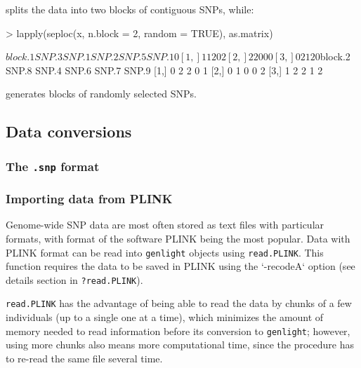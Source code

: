 \documentclass{article}
\begin{document}
splits the data into two blocks of contiguous SNPs, while:
\begin{Schunk}
\begin{Sinput}
> lapply(seploc(x, n.block = 2, random = TRUE), as.matrix)
\end{Sinput}
\begin{Soutput}
$block.1
     SNP.3 SNP.1 SNP.2 SNP.5 SNP.10
[1,]     1     1     2     0      2
[2,]     2     2     0     0      0
[3,]     0     2     1     2      0

$block.2
     SNP.8 SNP.4 SNP.6 SNP.7 SNP.9
[1,]     0     2     2     0     1
[2,]     0     1     0     0     2
[3,]     1     2     2     1     2
\end{Soutput}
\end{Schunk}
generates blocks of randomly selected SNPs.



\subsection{Data conversions}



\subsubsection{The \texttt{.snp} format}

\subsubsection{Importing data from PLINK}

Genome-wide SNP data are most often stored as text files with particular formats, with format of the
software PLINK being the most popular.
Data with PLINK format can be read into \texttt{genlight} objects using \texttt{read.PLINK}.
This function requires the data to be saved in PLINK using the `-recodeA` option (see details
section in \texttt{?read.PLINK}).

\texttt{read.PLINK} has the advantage of being able to read the data by chunks of a few individuals
(up to a single one at a time), which minimizes the amount of memory needed to read information
before its conversion to \texttt{genlight}; however, using more chunks also means more computational
time, since the procedure has to re-read the same file several time.
\end{document}
